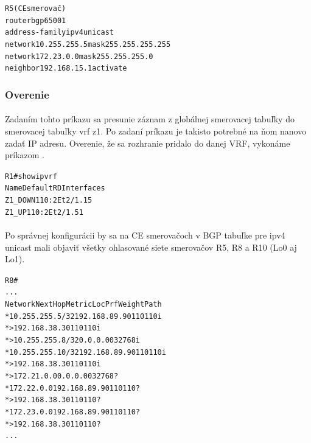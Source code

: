 \documentclass[12pt,twoside,a4paper]{report}
\begin{document}
\noindent
{\selectfont
\begin{small}
\begin{alltt}
R5 (CE smerovač)
router bgp 65001
  address-family ipv4 unicast
    network 10.255.255.5 mask 255.255.255.255
    network 172.23.0.0 mask 255.255.255.0
    neighbor 192.168.15.1 activate
\end{alltt}
\end{small}
}

\subsubsection{Overenie}
\paragraph{}
Zadaním tohto príkazu sa presunie záznam z globálnej smerovacej tabuľky do smerovacej tabuľky vrf z1. Po zadaní príkazu je takisto potrebné na ňom nanovo zadať IP adresu. Overenie, že sa rozhranie pridalo do danej VRF, vykonáme príkazom .

\noindent
{\selectfont
\begin{small}
\begin{alltt}
R1#show ip vrf
  Name                             Default RD          Interfaces  
  Z1_DOWN                               110:2            Et2/1.15
  Z1_UP                                 110:2            Et2/1.51
\end{alltt}
\end{small}
}

\paragraph{}
Po správnej konfigurácii by sa na CE smerovačoch v BGP tabuľke pre ipv4 unicast mali objaviť všetky ohlasované siete smerovačov R5, R8 a R10 (Lo0 aj Lo1).

\noindent
{\selectfont
\begin{small}
\begin{alltt}
R8#
...
     Network          Next Hop            Metric LocPrf Weight Path
 *   10.255.255.5/32  192.168.89.9                           0 110 110 i
 *>                   192.168.38.3                           0 110 110 i
 *>  10.255.255.8/32  0.0.0.0                  0         32768 i
 *   10.255.255.10/32 192.168.89.9                           0 110 110 i
 *>                   192.168.38.3                           0 110 110 i
 *>  172.21.0.0       0.0.0.0                  0         32768 ?
 *   172.22.0.0       192.168.89.9                           0 110 110 ?
 *>                   192.168.38.3                           0 110 110 ?
 *   172.23.0.0       192.168.89.9                           0 110 110 ?
 *>                   192.168.38.3                           0 110 110 ?
...
\end{alltt}
\end{small}
}
\end{document}
